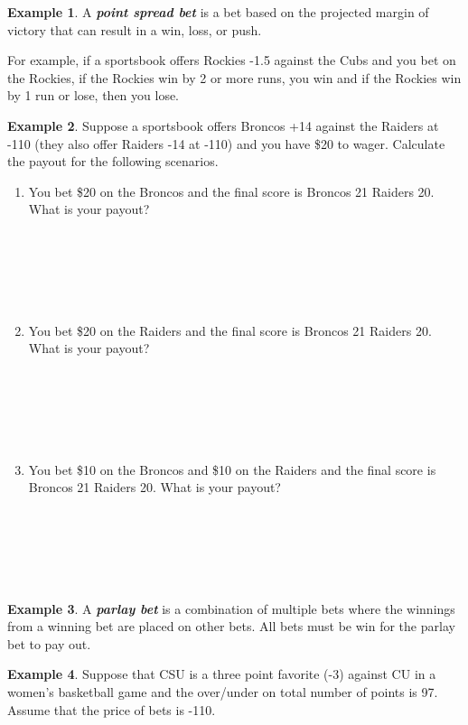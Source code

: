 \documentclass[
  11pt,
]{book}
\theoremstyle{definition}
\theoremstyle{definition}
\newtheorem{example}{Example}[chapter]
\theoremstyle{definition}
\theoremstyle{definition}
\theoremstyle{remark}
\begin{document}
\newpage

\begin{example}
A \textbf{\emph{point spread bet}} is a bet based on the projected margin of victory that can result in a win, loss, or push.

For example, if a sportsbook offers Rockies -1.5 against the Cubs and you bet on the Rockies, if the Rockies win by 2 or more runs, you win and if the Rockies win by 1 run or lose, then you lose.
\end{example}

\begin{example}
Suppose a sportsbook offers Broncos +14 against the Raiders at -110 (they also offer Raiders -14 at -110) and you have \$20 to wager. Calculate the payout for the following scenarios.
\end{example}

\begin{enumerate}
\def\labelenumi{(\alph{enumi})}
\item
  You bet \$20 on the Broncos and the final score is Broncos 21 Raiders 20. What is your payout?\\
  \strut \\
  \strut \\
  \strut \\
  \vfill
\item
  You bet \$20 on the Raiders and the final score is Broncos 21 Raiders 20. What is your payout?\\
  \strut \\
  \strut \\
  \strut \\
  \vfill
\item
  You bet \$10 on the Broncos and \$10 on the Raiders and the final score is Broncos 21 Raiders 20. What is your payout?\\
  \strut \\
  \strut \\
  \strut \\
  \vfill
\end{enumerate}

\begin{example}
A \textbf{\emph{parlay bet}} is a combination of multiple bets where the winnings from a winning bet are placed on other bets. All bets must be win for the parlay bet to pay out.
\end{example}

\newpage

\begin{example}
Suppose that CSU is a three point favorite (-3) against CU in a women's basketball game and the over/under on total number of points is 97. Assume that the price of bets is -110.
\end{example}
\end{document}
